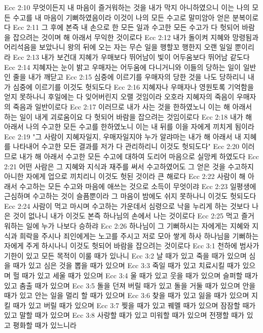 Ecc 2:10  무엇이든지 내 마음이 즐거워하는 것을 내가 막지 아니하였으니 이는 나의 모든 수고를 내 마음이 기뻐하였음이라 이것이 나의 모든 수고로 말미암아 얻은 분복이로다
Ecc 2:11  그 후에 본즉 내 손으로 한 모든 일과 수고한 모든 수고가 다 헛되어 바람을 잡으려는 것이며 해 아래서 무익한 것이로다
Ecc 2:12  내가 돌이켜 지혜와 망령됨과 어리석음을 보았나니 왕의 뒤에 오는 자는 무슨 일을 행할꼬 행한지 오랜 일일 뿐이리라
Ecc 2:13  내가 보건대 지혜가 우매보다 뛰어남이 빛이 어두움보다 뛰어남 같도다
Ecc 2:14  지혜자는 눈이 밝고 우매자는 어두움에 다니거니와 이들의 당하는 일이 일반인 줄을 내가 깨닫고
Ecc 2:15  심중에 이르기를 우매자의 당한 것을 나도 당하리니 내가 심중에 이르기를 이것도 헛되도다
Ecc 2:16  지혜자나 우매자나 영원토록 기억함을 얻지 못하나니 후일에는 다 잊어버린지 오랠 것임이라 오호라 지혜자의 죽음이 우매자의 죽음과 일반이로다
Ecc 2:17  이러므로 내가 사는 것을 한하였노니 이는 해 아래서 하는 일이 내게 괴로움이요 다 헛되어 바람을 잡으려는 것임이로다
Ecc 2:18  내가 해 아래서 나의 수고한 모든 수고를 한하였노니 이는 내 뒤를 이을 자에게 끼치게 됨이라
Ecc 2:19  "그 사람이 지혜자일지, 우매자일지야 누가 알랴마는 내가 해 아래서 내 지혜를 나타내어 수고한 모든 결과를 저가 다 관리하리니 이것도 헛되도다"
Ecc 2:20  이러므로 내가 해 아래서 수고한 모든 수고에 대하여 도리어 마음으로 실망케 하였도다
Ecc 2:21  어떤 사람은 그 지혜와 지식과 재주를 써서 수고하였어도 그 얻은 것을 수고하지 아니한 자에게 업으로 끼치리니 이것도 헛된 것이라 큰 해로다
Ecc 2:22  사람이 해 아래서 수고하는 모든 수고와 마음에 애쓰는 것으로 소득이 무엇이랴
Ecc 2:23  일평생에 근심하며 수고하는 것이 슬픔뿐이라 그 마음이 밤에도 쉬지 못하나니 이것도 헛되도다
Ecc 2:24  사람이 먹고 마시며 수고하는 가운데서 심령으로 낙을 누리게 하는 것보다 나은 것이 없나니 내가 이것도 본즉 하나님의 손에서 나는 것이로다
Ecc 2:25  먹고 즐거워하는 일에 누가 나보다 승하랴
Ecc 2:26  하나님이 그 기뻐하시는 자에게는 지혜와 지식과 희락을 주시나 죄인에게는 노고를 주시고 저로 모아 쌓게 하사 하나님을 기뻐하는 자에게 주게 하시나니 이것도 헛되어 바람을 잡으려는 것이로다
Ecc 3:1  천하에 범사가 기한이 있고 모든 목적이 이룰 때가 있나니
Ecc 3:2  날 때가 있고 죽을 때가 있으며 심을 때가 있고 심은 것을 뽑을 때가 있으며
Ecc 3:3  죽일 때가 있고 치료시킬 때가 있으며 헐 때가 있고 세울 때가 있으며
Ecc 3:4  울 때가 있고 웃을 때가 있으며 슬퍼할 때가 있고 춤출 때가 있으며
Ecc 3:5  돌을 던져 버릴 때가 있고 돌을 거둘 때가 있으며 안을 때가 있고 안는 일을 멀리 할 때가 있으며
Ecc 3:6  찾을 때가 있고 잃을 때가 있으며 지킬 때가 있고 버릴 때가 있으며
Ecc 3:7  찢을 때가 있고 꿰멜 때가 있으며 잠잠할 때가 있고 말할 때가 있으며
Ecc 3:8  사랑할 때가 있고 미워할 때가 있으며 전쟁할 때가 있고 평화할 때가 있느니라
